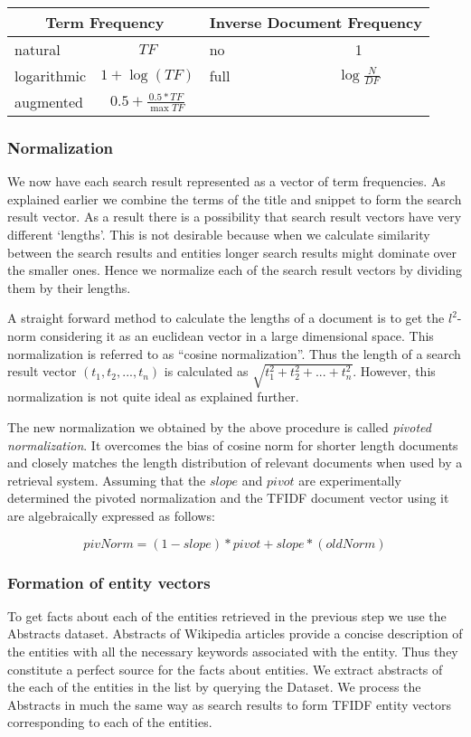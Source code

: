 \documentclass[a4paper,12pt]{report}
\begin{document}
\begin{table}[h]
\centering
\begin{tabular} {|l | c || l | c|}
  \hline
  \multicolumn{2}{|c||}{Term Frequency} & \multicolumn{2}{|c|}{Inverse
    Document Frequency} \\
  \hline
  natural & $TF$ & no & 1 \\
  logarithmic & $1 + \log (TF)$ & full & $\log \frac{N}{DF}$ \\
  augmented & $0.5 + \frac{0.5 * TF}{\max TF}$ & & \\
  \hline
\end{tabular}
\end{table}

\subsubsection{Normalization}

We now have each search result represented as a vector of term
frequencies. As explained earlier we combine the terms of the title
and snippet to form the search result vector. As a result there is a
possibility that search result vectors have very different
`lengths'. This is not desirable because when we calculate similarity
between the search results and entities longer search results might
dominate over the smaller ones. Hence we normalize each of the search
result vectors by dividing them by their lengths.

A straight forward method to calculate the lengths of a document is to
get the $l^2$-norm considering it as an euclidean vector in a large
dimensional space. This normalization is referred to as ``cosine
normalization''. Thus the length of a search result vector
$(t_1,t_2,...,t_n)$ is calculated as $\sqrt{t_1^2 + t_2^2 + ... +
  t_n^2}$. However, this normalization is not quite ideal as explained
further. 


The new normalization we obtained by the above procedure is called
{\it pivoted normalization}. It overcomes the bias of cosine norm for
shorter length documents and closely matches the length distribution
of relevant documents when used by a retrieval system.\cite{amit}
Assuming that the $slope$ and $pivot$ are experimentally determined
the pivoted normalization and the TFIDF document vector using it are
algebraically expressed as follows:

$$
      pivNorm = (1 - slope)*pivot + slope*(oldNorm)
$$


\subsubsection{Formation of entity vectors}
To get facts about each of the entities retrieved in the previous step
we use the Abstracts dataset. Abstracts of Wikipedia articles provide
a concise description of the entities with all the necessary keywords
associated with the entity. Thus they constitute a perfect source for
the facts about entities. We extract abstracts of the each of the
entities in the list by querying the Dataset. We process the Abstracts
in much the same way as search results to form TFIDF entity vectors
corresponding to each of the entities.
\end{document}
